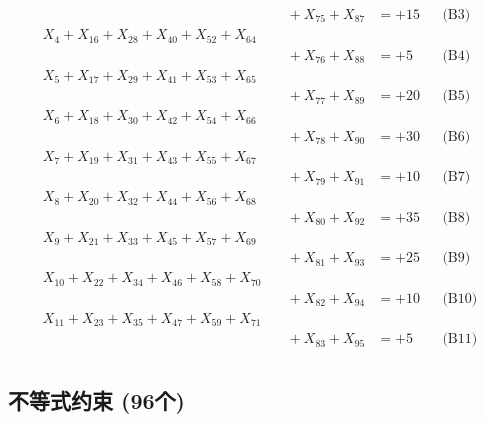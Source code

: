 \documentclass[a4paper,10pt]{article}
\begin{document}
{\begin{align}
&\quad  + X_{75} + X_{87} &= +15 && \text{(B3)} \\
X_{4} + X_{16} + X_{28} + X_{40} + X_{52} + X_{64} \\[0.1ex]
&\quad  + X_{76} + X_{88} &= +5 && \text{(B4)} \\
X_{5} + X_{17} + X_{29} + X_{41} + X_{53} + X_{65} \\[0.1ex]
&\quad  + X_{77} + X_{89} &= +20 && \text{(B5)} \\
X_{6} + X_{18} + X_{30} + X_{42} + X_{54} + X_{66} \\[0.1ex]
&\quad  + X_{78} + X_{90} &= +30 && \text{(B6)} \\
\allowbreak
X_{7} + X_{19} + X_{31} + X_{43} + X_{55} + X_{67} \\[0.1ex]
&\quad  + X_{79} + X_{91} &= +10 && \text{(B7)} \\
X_{8} + X_{20} + X_{32} + X_{44} + X_{56} + X_{68} \\[0.1ex]
&\quad  + X_{80} + X_{92} &= +35 && \text{(B8)} \\
X_{9} + X_{21} + X_{33} + X_{45} + X_{57} + X_{69} \\[0.1ex]
&\quad  + X_{81} + X_{93} &= +25 && \text{(B9)} \\
X_{10} + X_{22} + X_{34} + X_{46} + X_{58} + X_{70} \\[0.1ex]
&\quad  + X_{82} + X_{94} &= +10 && \text{(B10)} \\
X_{11} + X_{23} + X_{35} + X_{47} + X_{59} + X_{71} \\[0.1ex]
&\quad  + X_{83} + X_{95} &= +5 && \text{(B11)} \\
\end{align}
}

\subsection{不等式约束 (96个)}
\end{document}
